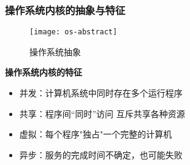 \begin{frame}[plain]
	\frametitle{操作系统内核的抽象与特征}
	\begin{figure}
	\centering
	\texttt{[image: os-abstract]}
	\caption{操作系统抽象}
\end{figure} \pause
	\textbf{操作系统内核的特征}
	\begin{itemize}
		\item 并发：计算机系统中同时存在多个运行程序 \pause
		\item 共享：程序间“同时”访问 互斥共享各种资源 \pause
		\item 虚拟：每个程序"独占"一个完整的计算机 \pause
		\item 异步：服务的完成时间不确定，也可能失败
	\end{itemize}

\end{frame}


